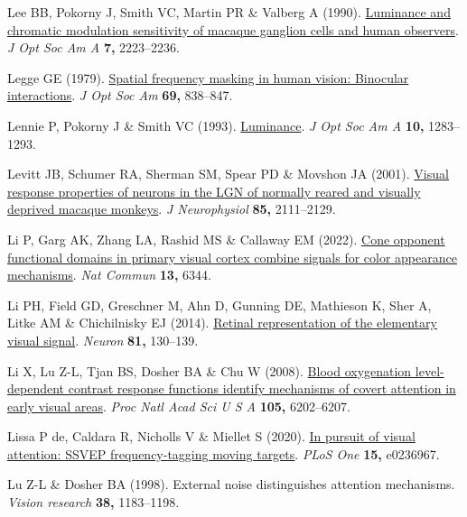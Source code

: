 \documentclass[
  letterpaper,
  DIV=11,
  numbers=noendperiod]{scrartcl}
\newlength{\cslhangindent}
\newenvironment{CSLReferences}[2] %
 {\begin{list}{}{%
  \setlength{\itemindent}{0pt}
  \setlength{\leftmargin}{0pt}
  \setlength{\parsep}{0pt}
  \ifodd #1
   \setlength{\leftmargin}{\cslhangindent}
   \setlength{\itemindent}{-1\cslhangindent}
  \fi
  \setlength{\itemsep}{#2\baselineskip}}}
 {\end{list}}
\begin{document}
\begin{CSLReferences}{1}{1}
Lee BB, Pokorny J, Smith VC, Martin PR \& Valberg A (1990).
\href{https://doi.org/10.1364/josaa.7.002223}{Luminance and chromatic
modulation sensitivity of macaque ganglion cells and human observers}.
\emph{J Opt Soc Am A} \textbf{7,} 2223--2236.

Legge GE (1979). \href{https://doi.org/10.1364/josa.69.000838}{Spatial
frequency masking in human vision: Binocular interactions}. \emph{J Opt
Soc Am} \textbf{69,} 838--847.

Lennie P, Pokorny J \& Smith VC (1993).
\href{https://doi.org/10.1364/josaa.10.001283}{Luminance}. \emph{J Opt
Soc Am A} \textbf{10,} 1283--1293.

Levitt JB, Schumer RA, Sherman SM, Spear PD \& Movshon JA (2001).
\href{https://doi.org/10.1152/jn.2001.85.5.2111}{Visual response
properties of neurons in the LGN of normally reared and visually
deprived macaque monkeys}. \emph{J Neurophysiol} \textbf{85,}
2111--2129.

Li P, Garg AK, Zhang LA, Rashid MS \& Callaway EM (2022).
\href{https://doi.org/10.1038/s41467-022-34020-2}{Cone opponent
functional domains in primary visual cortex combine signals for color
appearance mechanisms}. \emph{Nat Commun} \textbf{13,} 6344.

Li PH, Field GD, Greschner M, Ahn D, Gunning DE, Mathieson K, Sher A,
Litke AM \& Chichilnisky EJ (2014).
\href{https://doi.org/10.1016/j.neuron.2013.10.043}{Retinal
representation of the elementary visual signal}. \emph{Neuron}
\textbf{81,} 130--139.

Li X, Lu Z-L, Tjan BS, Dosher BA \& Chu W (2008).
\href{https://doi.org/10.1073/pnas.0801390105}{Blood oxygenation
level-dependent contrast response functions identify mechanisms of
covert attention in early visual areas}. \emph{Proc Natl Acad Sci U S A}
\textbf{105,} 6202--6207.

Lissa P de, Caldara R, Nicholls V \& Miellet S (2020).
\href{https://doi.org/10.1371/journal.pone.0236967}{In pursuit of visual
attention: SSVEP frequency-tagging moving targets}. \emph{PLoS One}
\textbf{15,} e0236967.

Lu Z-L \& Dosher BA (1998). External noise distinguishes attention
mechanisms. \emph{Vision research} \textbf{38,} 1183--1198.


\end{CSLReferences}
\end{document}
